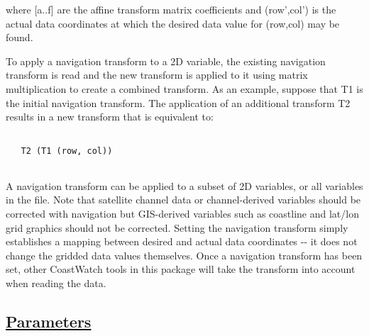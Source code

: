  where [a..f] are the affine transform matrix coefficients and (row',col') is the actual data coordinates at which the desired data value for (row,col) may be found.


 To apply a navigation transform to a 2D variable, the existing navigation transform is read and the new transform is applied to it using matrix multiplication to create a combined transform. As an example, suppose that T1 is the initial navigation transform. The application of an additional transform T2 results in a new transform that is equivalent to:
\begin{verbatim}

   T2 (T1 (row, col))
 
\end{verbatim}


 A navigation transform can be applied to a subset of 2D variables, or all variables in the file. Note that satellite channel data or channel-derived variables should be corrected with navigation but GIS-derived variables such as coastline and lat/lon grid graphics should not be corrected. Setting the navigation transform simply establishes a mapping between desired and actual data coordinates -{-} it does not change the gridded data values themselves. Once a navigation transform has been set, other CoastWatch tools in this package will take the transform into account when reading the data. 
\subsection*{\underline{Parameters}}
